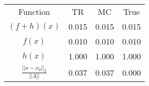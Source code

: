 \begin{tabular}{| c |c |c |c |}
    \hline
    \rowcolor[gray]{0.9}
\multicolumn{4}{|c|}{Minima} \\ \hline Function & TR & MC & True \\
    \hline
  \rowcolor[gray]{0.7}
    $ (f + h)(x) $ & 0.015 & 0.015 & 0.015 \\
  \hline
  \rowcolor[gray]{0.8}
    $ f(x) $ & 0.010 & 0.010 & 0.010 \\
  \hline
  \rowcolor[gray]{0.7}
    $ h(x) $ & 1.000 & 1.000 & 1.000 \\
  \hline
  \rowcolor[gray]{0.8}
    $ \frac{||x - x_0||_2}{||A||} $ & 0.037 & 0.037 & 0.000 \\
  \hline
\end{tabular}
